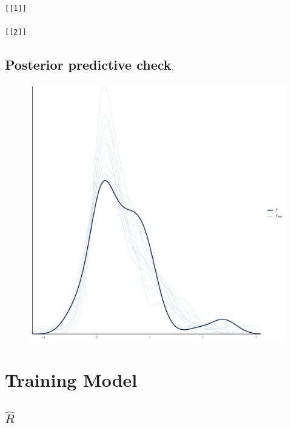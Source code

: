 \documentclass[
]{report}
\begin{document}
\begin{verbatim}
[[1]]

[[2]]
\end{verbatim}

\hypertarget{posterior-predictive-check-7}{%
\section{Posterior predictive
check}\label{posterior-predictive-check-7}}

\begin{figure}

{\centering \includegraphics[width=1\textwidth,height=\textheight]{diagnostic_plots_files/figure-pdf/unnamed-chunk-24-1.pdf}

}

\end{figure}

\hypertarget{training-model}{%
\chapter{Training Model}\label{training-model}}

\hypertarget{hatr-8}{%
\section{\texorpdfstring{\(\hat{R}\)}{\textbackslash hat\{R\}}}\label{hatr-8}}
\end{document}
